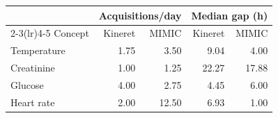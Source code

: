 \begin{tabular}{lrrrr}
\toprule
 & \multicolumn{2}{c}{Acquisitions/day} & \multicolumn{2}{c}{Median gap (h)} \\
\cmidrule(lr){2-3}\cmidrule(lr){4-5}
Concept & Kineret & MIMIC & Kineret & MIMIC \\
\midrule
Temperature & 1.75 & 3.50 & 9.04 & 4.00 \\
Creatinine & 1.00 & 1.25 & 22.27 & 17.88 \\
Glucose & 4.00 & 2.75 & 4.45 & 6.00 \\
Heart rate & 2.00 & 12.50 & 6.93 & 1.00 \\
\bottomrule
\end{tabular}